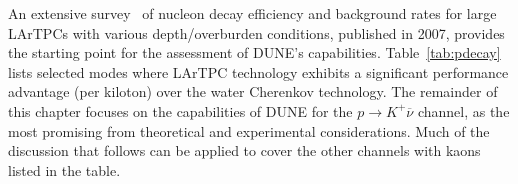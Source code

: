 An extensive survey~\cite{Bueno:2007um} of nucleon decay efficiency 
and background rates for large LArTPCs with various depth/overburden 
conditions, published in 2007, provides the starting point for the 
assessment of DUNE's capabilities.  Table~\ref{tab:pdecay} lists selected
modes where LArTPC technology exhibits a significant performance 
advantage (per kiloton) over the water Cherenkov technology.
The remainder of this chapter focuses on the capabilities 
of DUNE for the $p\to K^+\overline{\nu}$ channel, as the most 
promising from theoretical and experimental 
considerations.  Much of the discussion that follows can be 
applied to cover the other channels with kaons listed in 
the table.
%
\begin{table}[!htbp]
\caption[Efficiencies and background rates for nucleon decay modes]
        {Efficiencies and background rates (events per \SI{}{\Mtyr}) for nucleon decay 
         channels of interest for a large underground LArTPC~\cite{Bueno:2007um}, and 
         comparison with water Cherenkov detector capabilities.  
         The entries for the water Cherenkov capabilities are based 
         on experience with the \superk{} detector~\cite{kearns_isoups}.  
        }
\begin{center}
\end{center}
\label{tab:pdecay}
\end{table}
%

